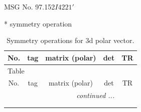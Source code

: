 \documentclass[fleqn,8pt]{jsarticle}
\begin{document}
\setcounter{MaxMatrixCols}{32}

\renewcommand{\tablename}{Table~}
\renewcommand{\figurename}{Figure~}
\begin{center}
\LARGE
MSG No. 97.152\quad$I4221'$
\end{center}
* symmetry operation
\renewcommand{\arraystretch}{1.3}
\begin{longtable}{ccccc}
\caption{Symmetry operations for 3d polar vector.}
 \\
 \hline \hline
No. & tag & matrix (polar) & det & TR \\ \hline \endfirsthead

\multicolumn{4}{l}{\tablename\ \thetable{}} \\
 \hline \hline
No. & tag & matrix (polar) & det & TR \\ \hline \endhead

 \hline \hline
\multicolumn{4}{r}{\footnotesize\it continued ...} \\ \endfoot

 \hline \hline
\multicolumn{4}{r}{} \\ \endlastfoot


\end{longtable}
\end{document}
